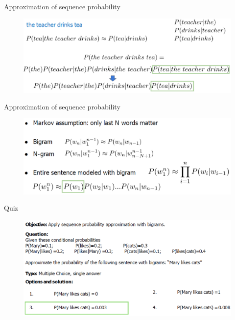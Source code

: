 \begin{frame}{Approximation of sequence probability}
    \begin{figure}
        \centering
        \includegraphics[width=\textwidth,height=0.8\textheight,keepaspectratio]{images/nlp-intro/approx-seq-prob.png}
    \end{figure}
\end{frame}

\begin{frame}{Approximation of sequence probability}
    \begin{figure}
        \centering
        \includegraphics[width=\textwidth,height=0.8\textheight,keepaspectratio]{images/nlp-intro/approx-seq-prob-2.png}
    \end{figure}
\end{frame}

\begin{frame}{Quiz}
    \begin{figure}
        \centering
        \includegraphics[width=\textwidth,height=0.8\textheight,keepaspectratio]{images/nlp-intro/quiz-seq-prob.png}
    \end{figure}
\end{frame}